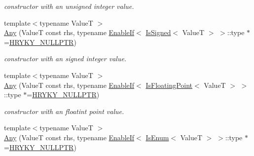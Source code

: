 \begin{DoxyCompactItemize}
\begin{DoxyCompactList}\small\item\em constructor with an unsigned integer value. \end{DoxyCompactList}\item 
\hypertarget{classhryky_1_1_any_a4e101053b5c51d90939b458f7243a420}{{\footnotesize template$<$typename Value\-T $>$ }\\\hyperlink{classhryky_1_1_any_a4e101053b5c51d90939b458f7243a420}{Any} (Value\-T const rhs, typename \hyperlink{classhryky_1_1_enable_if}{Enable\-If}$<$ \hyperlink{classhryky_1_1_is_signed}{Is\-Signed}$<$ Value\-T $>$ $>$\-::type $\ast$=\hyperlink{common_8h_a4cd4ac09cfcdbd6b30ee69afc156e210}{H\-R\-Y\-K\-Y\-\_\-\-N\-U\-L\-L\-P\-T\-R})}\label{classhryky_1_1_any_a4e101053b5c51d90939b458f7243a420}

\begin{DoxyCompactList}\small\item\em constructor with an signed integer value. \end{DoxyCompactList}\item 
\hypertarget{classhryky_1_1_any_aeb3fe2ce3157fc1d59d5f681c41d4aed}{{\footnotesize template$<$typename Value\-T $>$ }\\\hyperlink{classhryky_1_1_any_aeb3fe2ce3157fc1d59d5f681c41d4aed}{Any} (Value\-T const rhs, typename \hyperlink{classhryky_1_1_enable_if}{Enable\-If}$<$ \hyperlink{classhryky_1_1_is_floating_point}{Is\-Floating\-Point}$<$ Value\-T $>$ $>$\-::type $\ast$=\hyperlink{common_8h_a4cd4ac09cfcdbd6b30ee69afc156e210}{H\-R\-Y\-K\-Y\-\_\-\-N\-U\-L\-L\-P\-T\-R})}\label{classhryky_1_1_any_aeb3fe2ce3157fc1d59d5f681c41d4aed}

\begin{DoxyCompactList}\small\item\em constructor with an floatint point value. \end{DoxyCompactList}\item 
\hypertarget{classhryky_1_1_any_abc9a34a6126cea0b2449159c5d121d46}{{\footnotesize template$<$typename Value\-T $>$ }\\\hyperlink{classhryky_1_1_any_abc9a34a6126cea0b2449159c5d121d46}{Any} (Value\-T const rhs, typename \hyperlink{classhryky_1_1_enable_if}{Enable\-If}$<$ \hyperlink{classhryky_1_1_is_enum}{Is\-Enum}$<$ Value\-T $>$ $>$\-::type $\ast$=\hyperlink{common_8h_a4cd4ac09cfcdbd6b30ee69afc156e210}{H\-R\-Y\-K\-Y\-\_\-\-N\-U\-L\-L\-P\-T\-R})}\label{classhryky_1_1_any_abc9a34a6126cea0b2449159c5d121d46}


\end{DoxyCompactItemize}

